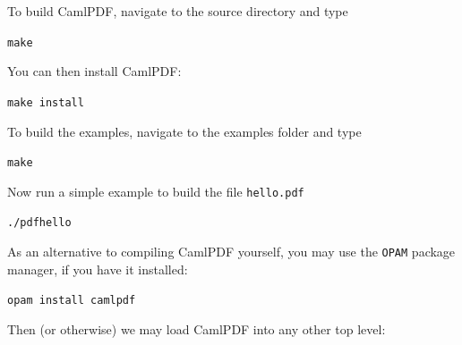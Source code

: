\documentclass[a4paper]{memoir}
\begin{document}
To build \textsf{CamlPDF}, navigate to the source directory and type
\begin{framed}
\verb!make!
\end{framed}

\noindent You can then install \textsf{CamlPDF}:
\begin{framed}
\verb!make install!
\end{framed}


\noindent To build the examples, navigate to the examples folder and type
\begin{framed}
\verb!make!
\end{framed}
\noindent Now run a simple example to build the file \verb!hello.pdf!
\begin{framed}
\verb!./pdfhello!
\end{framed}

\noindent As an alternative to compiling CamlPDF yourself, you may use the \texttt{OPAM} package manager, if you have it installed:
\begin{framed}
\verb!opam install camlpdf!
\end{framed}

\noindent Then (or otherwise) we may load CamlPDF into any other top level:
\end{document}
